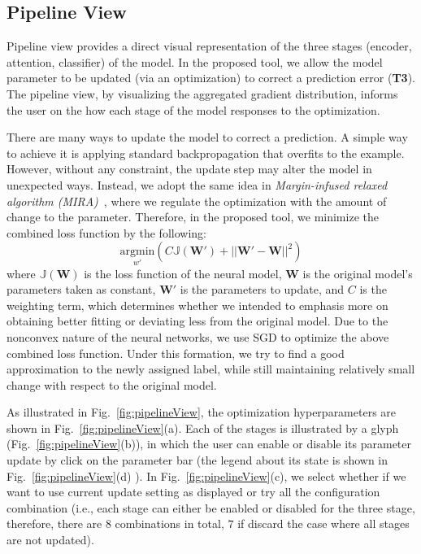 \subsection{Pipeline View}
\label{sec:pipeline}
Pipeline view provides a direct visual representation of the three stages (encoder, attention, classifier) of the model. In the proposed tool, we allow the model parameter to be updated (via an optimization) to correct a prediction error (\textbf{T3}). The pipeline view, by visualizing the aggregated gradient distribution, informs the user on the how each stage of the model responses to the optimization.

There are many ways to update the model to correct a prediction. A simple way to achieve it is applying standard backpropagation that overfits to the example. However, without any constraint, the update step may alter the model in unexpected ways.
Instead, we adopt the same idea in \emph{Margin-infused relaxed algorithm (MIRA)}~\cite{CrammerSinger2003}, where we regulate the optimization with the amount of change to the parameter. Therefore, in the proposed tool, we minimize the combined loss function by the following:
\begin{equation}
\underset{w'}{\mathrm{argmin}}( C \mathbb{J}(\mathbf{W}') + ||\mathbf{W}' - \mathbf{W}||^2)
\end{equation}
where $\mathbb{J}(\mathbf{W})$ is the loss function of the neural model, $\mathbf{W}$ is the original model's parameters taken as constant, $\mathbf{W}'$ is the parameters to update, and $C$ is the weighting term, which determines whether we intended to emphasis more on obtaining better fitting or deviating less from the original model. Due to the nonconvex nature of the neural networks, we use SGD to optimize the above combined loss function.
%
Under this formation, we try to find a good approximation to the newly assigned label, while still maintaining relatively small change with respect to the original model.

As illustrated in Fig.~\ref{fig:pipelineView},
the optimization hyperparameters are shown in Fig.~\ref{fig:pipelineView}(a). Each of the stages is illustrated by a glyph (Fig.~\ref{fig:pipelineView}(b)), in which the user can enable or disable its parameter update by click on the parameter bar (the legend about its state is shown in Fig.~\ref{fig:pipelineView}(d) ). In Fig.~\ref{fig:pipelineView}(c), we select whether if we want to use current update setting as displayed or try all the configuration combination (i.e., each stage can either be enabled or disabled for the three stage, therefore, there are $8$ combinations in total, $7$ if discard the case where all stages are not updated).

